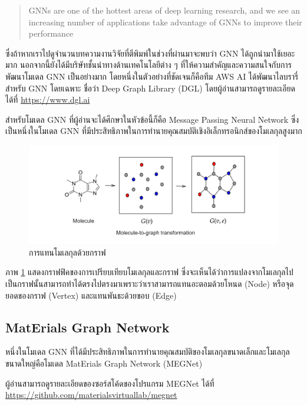 \blockquote{GNNs are one of the hottest areas of deep learning research, and we see an increasing number of applications take advantage of GNNs to improve their performance}

\noindent ซึ่งถ้าหากเราไปดูจำนวนบทความงานวิจัยที่ตีพิมพ์ในช่วงที่ผ่านมาจะพบว่า GNN ได้ถูกนำมาใช้เยอะมาก นอกจากนี้ยังได้มีบริษัทชั้นนำทางด้านเทคโนโลยีต่าง ๆ ที่ให้ความสำคัญและความสนใจกับการพัฒนาโมเดล GNN เป็นอย่างมาก โดยหนึ่งในตัวอย่างที่ชัดเจนก็คือทีม AWS AI ได้พัฒนาไลบรารี่สำหรับ GNN โดยเฉพาะ ชื่อว่า Deep Graph Library (DGL) โดยผู้อ่านสามารถดูรายละเอียดได้ที่ \url{https://www.dgl.ai}

สำหรับโมเดล GNN ที่ผู้อ่านจะได้ศึกษาในหัวข้อนี้ก็คือ Message Passing Neural Network ซึ่งเป็นหนึ่งในโมเดล GNN ที่มีประสิทธิภาพในการทำนายคุณสมบัติเชิงอิเล็กทรอนิกส์ของโมเลกุลสูงมาก

\begin{figure}[H]
    \centering
    \includegraphics[width=\linewidth]{fig/mol-2-graph.png}
    \caption{การแทนโมเลกุลด้วยกราฟ}
    \label{fig:mol_2_graph}
\end{figure}

ภาพ \ref{fig:mol_2_graph} แสดงกราฟฟิคของการเปรียบเทียบโมเลกุลและกราฟ ซึ่งจะเห็นได้ว่าการแปลงจากโมเลกุลไปเป็นกราฟนั้นสามารถทำได้ตรงไปตรงมาเพราะว่าเราสามารถแทนอะตอมด้วยโหนด (Node) หรือจุดยอดของกราฟ (Vertex) และแทนพันธะด้วยขอบ (Edge)

\subsection{MatErials Graph Network}
\label{ssec:megnet}

หนึ่งในโมเดล GNN ที่ได้มีประสิทธิภาพในการทำนายคุณสมบัติของโมเลกุลขนาดเล็กและโมเลกุลขนาดใหญ่คือโมเดล MatErials Graph Network (MEGNet)\autocite{chen2019}

ผู้อ่านสามารถดูรายละเอียดของซอร์สโค้ดของโปรแกรม MEGNet ได้ที่ \url{https://github.com/materialsvirtuallab/megnet}

